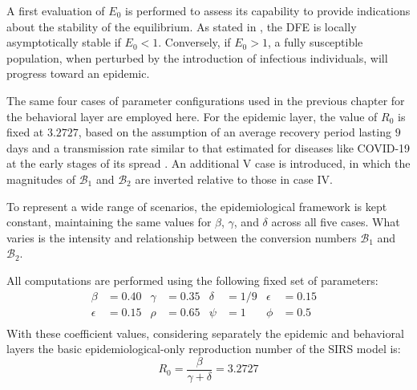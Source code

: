 A first evaluation of $E_0$ is performed to assess its capability to provide indications about the stability of the equilibrium. As stated in \cite{van_den_Driessche_2002,van_den_Driessche_2017}, the DFE is locally asymptotically stable if $E_0 < 1$. Conversely, if $E_0 > 1$, a fully susceptible population, when perturbed by the introduction of infectious individuals, will progress toward an epidemic.

The same four cases of parameter configurations used in the previous chapter for the behavioral layer are employed here. For the epidemic layer, the value of $R_0$ is fixed at $3.2727$, based on the assumption of an average recovery period lasting $9$ days and a transmission rate similar to that estimated for diseases like COVID-19 at the early stages of its spread \cite{data_R0_covid}. An additional V case is introduced, in which the magnitudes of $\mathcal{B}_1$ and $\mathcal{B}_2$ are inverted relative to those in case IV.

To represent a wide range of scenarios, the epidemiological framework is kept constant, maintaining the same values for $\beta$, $\gamma$, and $\delta$ across all five cases. What varies is the intensity and relationship between the conversion numbers $\mathcal{B}_1$ and $\mathcal{B}_2$.

All computations are performed using the following fixed set of parameters:
\begin{align*}
\beta &= 0.40  &\gamma &= 0.35 & \delta &= 1/9 &  \epsilon &= 0.15 &\\
\epsilon &= 0.15 & \rho &= 0.65  &\psi &= 1 & \phi &= 0.5 &   \\	
\end{align*}
With these coefficient values, considering separately the epidemic and behavioral layers the basic epidemiological-only reproduction number of the SIRS model is:
 \begin{equation*}
 	R_0= \frac{\beta}{\gamma+\delta} = 3.2727 
 \end{equation*}
 
